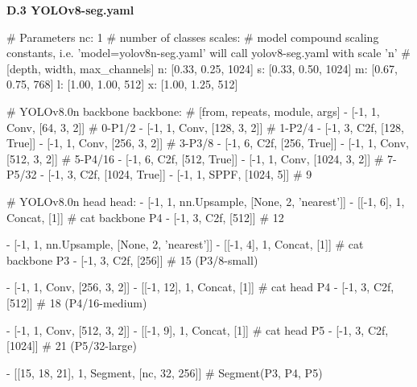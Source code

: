 \documentclass{MathorCupmodeling}
\begin{document}
\textbf{D.3 YOLOv8-seg.yaml}
\begin{python}
# Parameters
nc: 1  # number of classes
scales: # model compound scaling constants, i.e. 'model=yolov8n-seg.yaml' will call yolov8-seg.yaml with scale 'n'
  # [depth, width, max_channels]
  n: [0.33, 0.25, 1024]
  s: [0.33, 0.50, 1024]
  m: [0.67, 0.75, 768]
  l: [1.00, 1.00, 512]
  x: [1.00, 1.25, 512]

# YOLOv8.0n backbone
backbone:
  # [from, repeats, module, args]
  - [-1, 1, Conv, [64, 3, 2]]  # 0-P1/2
  - [-1, 1, Conv, [128, 3, 2]]  # 1-P2/4
  - [-1, 3, C2f, [128, True]]
  - [-1, 1, Conv, [256, 3, 2]]  # 3-P3/8
  - [-1, 6, C2f, [256, True]]
  - [-1, 1, Conv, [512, 3, 2]]  # 5-P4/16
  - [-1, 6, C2f, [512, True]]
  - [-1, 1, Conv, [1024, 3, 2]]  # 7-P5/32
  - [-1, 3, C2f, [1024, True]]
  - [-1, 1, SPPF, [1024, 5]]  # 9

# YOLOv8.0n head
head:
  - [-1, 1, nn.Upsample, [None, 2, 'nearest']]
  - [[-1, 6], 1, Concat, [1]]  # cat backbone P4
  - [-1, 3, C2f, [512]]  # 12

  - [-1, 1, nn.Upsample, [None, 2, 'nearest']]
  - [[-1, 4], 1, Concat, [1]]  # cat backbone P3
  - [-1, 3, C2f, [256]]  # 15 (P3/8-small)

  - [-1, 1, Conv, [256, 3, 2]]
  - [[-1, 12], 1, Concat, [1]]  # cat head P4
  - [-1, 3, C2f, [512]]  # 18 (P4/16-medium)

  - [-1, 1, Conv, [512, 3, 2]]
  - [[-1, 9], 1, Concat, [1]]  # cat head P5
  - [-1, 3, C2f, [1024]]  # 21 (P5/32-large)

  - [[15, 18, 21], 1, Segment, [nc, 32, 256]]  # Segment(P3, P4, P5)
\end{python}
\end{document}
